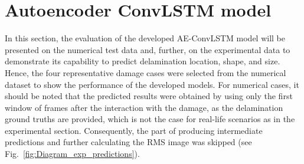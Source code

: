 \section{Autoencoder ConvLSTM model}
\label{sec53}
In this section, the evaluation of the developed AE-ConvLSTM model will be presented on the numerical test data and, further, on the experimental data to demonstrate its capability to predict delamination location, shape, and size.
Hence, the four representative damage cases were selected from the numerical dataset to show the performance of the developed models.
For numerical cases, it should be noted that the predicted results were obtained by using only the first window of frames after the interaction with the damage, as the delamination ground truths are provided, which is not the case for real-life scenarios as in the experimental section. 
Consequently, the part of producing intermediate predictions and further calculating the RMS image was skipped (see Fig.~\ref{fig:Diagram_exp_predictions}).

